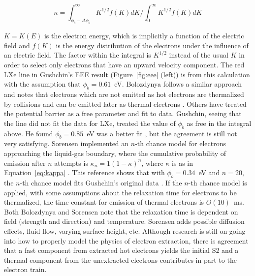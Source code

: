 \begin{equation}
\label{eq:kappa}
\kappa = \int_{\phi_{b} - \Delta\phi_{b}}^\infty K^{1/2} f(K) dK \Big / \int_{0}^{\infty} K^{1/2} f(K)dK
\end{equation}

$K = K(E)$ is the electron energy, which is implicitly a function of the electric field and $f(K)$ is the energy distribution of the electrons under the influence of an electric field. The factor within the integral is $K^{1/2}$ instead of the usual $K$ in order to select only electrons that have an upward velocity component. The red \ac{LXe} line in Gushchin's \ac{EEE} result (Figure~\ref{fig:eee} (left)) is from this calculation with the assumption that $\phi_{b}=0.61$~eV. Bolozdynya follows a similar approach and notes that electrons which are not emitted as hot electrons are thermalized by collisions and can be emitted later as thermal electrons \cite{Bolozdynya1999}. Others have treated the potential barrier as a free parameter and fit to data. Gushchin, seeing that the line did not fit the data for \ac{LXe}, treated the value of $\phi_{b}$ as free in the integral above. He found $\phi_{b}= 0.85$~eV was a better fit \cite{Gushchin1982}, but the agreement is still not very satisfying. Sorensen implemented an $n$-th chance model for electrons approaching the liquid-gas boundary, where the cumulative probability of emission after $n$ attempts is $\kappa_{n} = 1 (1-\kappa)^{n}$, where $\kappa$ is as in Equation~\ref{eq:kappa} \cite{Sorensen2017}. This reference shows that with $\phi_{b}= 0.34$~eV and $n=20$, the $n$-th chance model fits Gushchin's original data \cite{Sorensen2017}. If the $n$-th chance model is applied, with some assumptions about the relaxation time for electrons to be thermalized, the time constant for emission of thermal electrons is $O(10)$~ms. Both Bolozdynya \cite{Bolozdynya1999} and Sorensen \cite{Sorensen2017} note that the relaxation time is dependent on field (strength and direction) and temperature. Sorensen adds possible diffusion effects, fluid flow, varying surface height, etc. Although research is still on-going into how to properly model the physics of electron extraction, there is agreement that a fast component from extracted hot electrons yields the initial S2 and a thermal component from the unextracted electrons contributes in part to the electron train.


